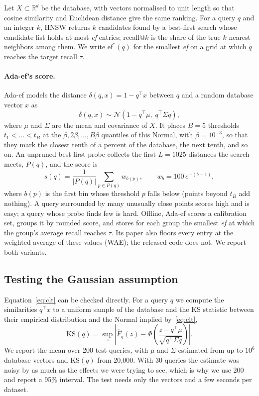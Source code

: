 \documentclass[sigconf,review=false,screen]{acmart}
\newcommand{\ef}{\textit{ef}}
\newcommand{\KS}{\mathrm{KS}}
\begin{document}
Let $X \subset \mathbb{R}^d$ be the database, with vectors normalised to unit length so that
cosine similarity and Euclidean distance give the same ranking. For a query $q$ and an integer $k$,
HNSW returns $k$ candidates found by a best-first search whose candidate list holds at most \ef{}
entries; recall@$k$ is the share of the true $k$ nearest neighbors among them. We write
$\mathrm{ef}^*(q)$ for the smallest \ef{} on a grid at which $q$ reaches the target recall $\tau$.

\paragraph{Ada-ef's score.}
Ada-ef models the distance $\delta(q,x) = 1 - q^\top x$ between $q$ and a random database vector
$x$ as
\begin{equation}
  \delta(q,x) \sim \mathcal{N}\!\left(1 - q^\top\mu,\; q^\top \Sigma q\right),
  \label{eq:clt}
\end{equation}
where $\mu$ and $\Sigma$ are the mean and covariance of $X$. It places $B = 5$ thresholds
$t_1 < \dots < t_B$ at the $\beta, 2\beta, \dots, B\beta$ quantiles of this Normal, with
$\beta = 10^{-3}$, so that they mark the closest tenth of a percent of the database, the next
tenth, and so on. An unpruned best-first probe collects the first $L = 1025$ distances the search
meets, $P(q)$, and the score is
\begin{equation}
  s(q) = \frac{1}{|P(q)|} \sum_{p \in P(q)} w_{b(p)}, \qquad w_b = 100\, e^{-(b-1)},
  \label{eq:score}
\end{equation}
where $b(p)$ is the first bin whose threshold $p$ falls below (points beyond $t_B$ add nothing). A
query surrounded by many unusually close points scores high and is easy; a query whose probe finds
few is hard. Offline, Ada-ef scores a calibration set, groups it by rounded score, and stores for
each group the smallest \ef{} at which the group's average recall reaches $\tau$. Its paper also
floors every entry at the weighted average of these values (WAE); the released code does not. We
report both variants.

\subsection{Testing the Gaussian assumption}

Equation~\eqref{eq:clt} can be checked directly. For a query $q$ we compute the similarities
$q^\top x$ to a uniform sample of the database and the KS statistic between their empirical
distribution and the Normal implied by~\eqref{eq:clt},
\begin{equation}
  \KS(q) = \sup_z \left| \hat F_q(z) - \Phi\!\left(\frac{z - q^\top\mu}{\sqrt{q^\top\Sigma q}}\right) \right| .
\end{equation}
We report the mean over 200 test queries, with $\mu$ and $\Sigma$ estimated from up to $10^6$
database vectors and $\KS(q)$ from 20{,}000. With 30 queries the estimate was noisy by as much as
the effects we were trying to see, which is why we use 200 and report a 95\% interval. The test
needs only the vectors and a few seconds per dataset.
\end{document}
